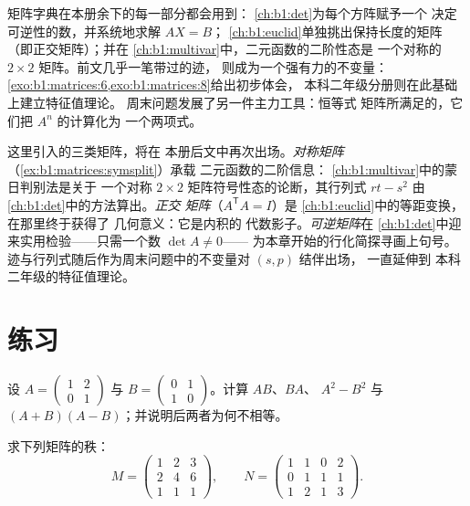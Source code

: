 \begin{remark}[矩阵字典的去向]
\label{rem:b1:matrices:whereused}
矩阵字典在本册余下的每一部分都会用到：
\cref{ch:b1:det}为每个方阵赋予一个
决定可逆性的数，并系统地求解 $AX = B$；
\cref{ch:b1:euclid}单独挑出保持长度的矩阵
（即正交矩阵）；并在
\cref{ch:b1:multivar}中，二元函数的二阶性态是
一个对称的 $2 \times 2$ 矩阵。前文几乎一笔带过的迹，
则成为一个强有力的不变量：
\cref{exo:b1:matrices:6,exo:b1:matrices:8}给出初步体会，
本科二年级分册则在此基础上建立特征值理论。
周末问题发展了另一件主力工具：恒等式
矩阵所满足的，它们把 $A^n$ 的计算化为
一个两项式。
\end{remark}

\begin{remark}[第 3 册内的展望]
\label{rem:b1:matrices:perspectives}
这里引入的三类矩阵，将在
本册后文中再次出场。\emph{对称矩阵}
（\cref{ex:b1:matrices:symsplit}）承载
二元函数的二阶信息：
\cref{ch:b1:multivar}中的蒙日判别法是关于
一个对称 $2\times2$ 矩阵符号性态的论断，其行列式 $rt - s^2$
由\cref{ch:b1:det}中的方法算出。\emph{正交
矩阵}（$A^{\mathsf T}A = I$）是
\cref{ch:b1:euclid}中的等距变换，在那里终于获得了
几何意义：它是内积的
代数影子。\emph{可逆矩阵}在
\cref{ch:b1:det}中迎来实用检验——只需一个数 $\det A \neq 0$——
为本章开始的行化简探寻画上句号。
迹与行列式随后作为周末问题中的不变量对 $(s, p)$ 结伴出场，
一直延伸到
本科二年级的特征值理论。
\end{remark}

\section{练习}

\begin{exercise}[$\star$]\label{exo:b1:matrices:1}
设 $A = \begin{pmatrix} 1 & 2 \\ 0 & 1 \end{pmatrix}$ 与 $B =
\begin{pmatrix} 0 & 1 \\ 1 & 0\end{pmatrix}$。计算 $AB$、$BA$、
$A^2 - B^2$ 与 $(A+B)(A-B)$；并说明后两者为何不相等。
\end{exercise}

\begin{exercise}[$\star$]\label{exo:b1:matrices:2}
求下列矩阵的秩：
\[
M = \begin{pmatrix}
1 & 2 & 3\\
2 & 4 & 6\\
1 & 1 & 1
\end{pmatrix},
\qquad
N = \begin{pmatrix}
1 & 1 & 0 & 2\\
0 & 1 & 1 & 1\\
1 & 2 & 1 & 3
\end{pmatrix}.
\]
\end{exercise}

